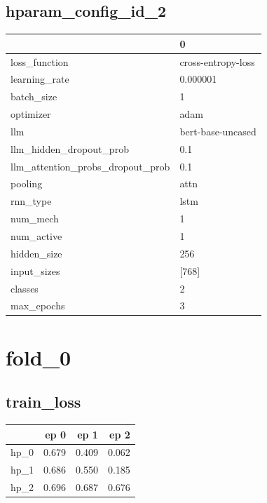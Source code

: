 \documentclass{article}
\begin{document}
\subsection{hparam\_config\_id\_2}
\begin{tabular}{ll}
\toprule
{} &                   0 \\
\midrule
loss\_function                    &  cross-entropy-loss \\
learning\_rate                    &            0.000001 \\
batch\_size                       &                   1 \\
optimizer                        &                adam \\
llm                              &   bert-base-uncased \\
llm\_hidden\_dropout\_prob          &                 0.1 \\
llm\_attention\_probs\_dropout\_prob &                 0.1 \\
pooling                          &                attn \\
rnn\_type                         &                lstm \\
num\_mech                         &                   1 \\
num\_active                       &                   1 \\
hidden\_size                      &                 256 \\
input\_sizes                      &               [768] \\
classes                          &                   2 \\
max\_epochs                       &                   3 \\
\bottomrule
\end{tabular}

\section{fold\_0}
\subsection{train\_loss}
\begin{tabular}{lrrr}
\toprule
{} &   ep 0 &   ep 1 &   ep 2 \\
\midrule
hp\_0 &  0.679 &  0.409 &  0.062 \\
hp\_1 &  0.686 &  0.550 &  0.185 \\
hp\_2 &  0.696 &  0.687 &  0.676 \\
\bottomrule
\end{tabular}
\end{document}
